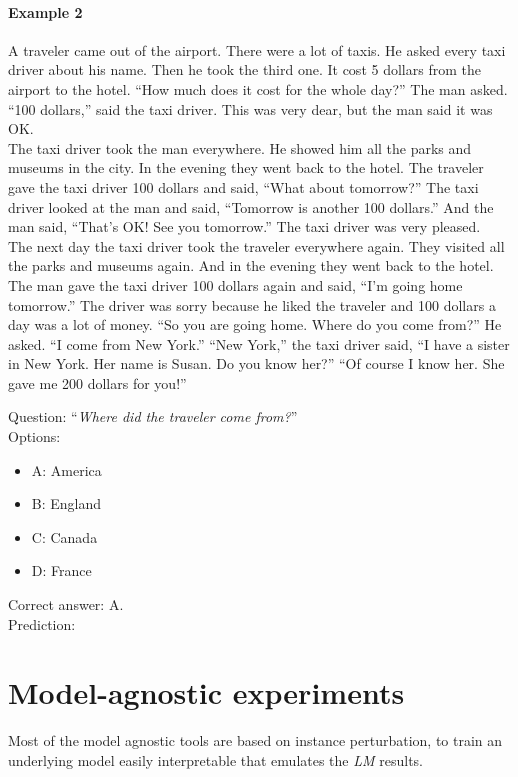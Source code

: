 \paragraph{Example 2}
\label{ex:2}
\begin{passage}
A traveler came out of the airport. There were a lot of taxis. He asked every taxi driver about his name. Then he took the third one. It cost 5 dollars from the airport to the hotel. ``How much does it cost for the whole day?'' The man asked. ``100 dollars,'' said the taxi driver. This was very dear, but the man said it was OK. \\
The taxi driver took the man everywhere. He showed him all the parks and museums in the city. In the evening they went back to the hotel. The traveler gave the taxi driver 100 dollars and said, ``What about tomorrow?'' The taxi driver looked at the man and said, ``Tomorrow is another 100 dollars.'' And the man said, ``That's OK! See you tomorrow.'' The taxi driver was very pleased. \\
The next day the taxi driver took the traveler everywhere again. They visited all the parks and museums again. And in the evening they went back to the hotel. The man gave the taxi driver 100 dollars again and said, ``I'm going home tomorrow.'' The driver was sorry because he liked the traveler and 100 dollars a day was a lot of money. ``So you are going home. Where do you come from?'' He asked. ``I come from New York.'' ``New York,'' the taxi driver said, ``I have a sister in New York. Her name is Susan. Do you know her?'' ``Of course I know her. She gave me 200 dollars for you!'' \\
\end{passage}
Question: ``\emph{Where did the traveler come from?}''\\
Options: 
\begin{itemize}
 \item A: America
 \item B: England
 \item C: Canada
 \item D: France
\end{itemize}
Correct answer: A. \\
Prediction: \\
\section{Model-agnostic experiments}
\label{sec:ModelAgnosticExperiments}
\noindent Most of the model agnostic tools are based on instance perturbation, to train an underlying model easily interpretable that emulates the \emph{LM} results.
